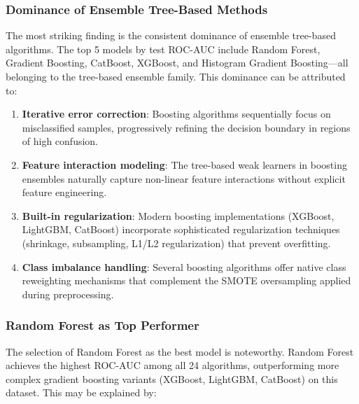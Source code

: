 \documentclass[conference,10pt]{IEEEtran}
\begin{document}
\subsubsection{Dominance of Ensemble Tree-Based Methods}

The most striking finding is the consistent dominance of ensemble tree-based algorithms. The top 5 models by test ROC-AUC include Random Forest, Gradient Boosting, CatBoost, XGBoost, and Histogram Gradient Boosting—all belonging to the tree-based ensemble family. This dominance can be attributed to:

\begin{enumerate}
    \item \textbf{Iterative error correction}: Boosting algorithms sequentially focus on misclassified samples, progressively refining the decision boundary in regions of high confusion.

    \item \textbf{Feature interaction modeling}: The tree-based weak learners in boosting ensembles naturally capture non-linear feature interactions without explicit feature engineering.

    \item \textbf{Built-in regularization}: Modern boosting implementations (XGBoost, LightGBM, CatBoost) incorporate sophisticated regularization techniques (shrinkage, subsampling, L1/L2 regularization) that prevent overfitting.

    \item \textbf{Class imbalance handling}: Several boosting algorithms offer native class reweighting mechanisms that complement the SMOTE oversampling applied during preprocessing.
\end{enumerate}

\subsubsection{Random Forest as Top Performer}

The selection of Random Forest as the best model is noteworthy. Random Forest achieves the highest ROC-AUC among all 24 algorithms, outperforming more complex gradient boosting variants (XGBoost, LightGBM, CatBoost) on this dataset. This may be explained by:
\end{document}

